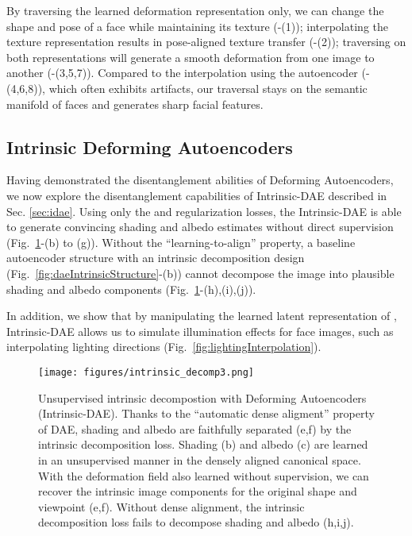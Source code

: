 \documentclass[runningheads]{llncs}
\begin{document}
By traversing the learned deformation representation only, we can change the shape and pose of a face while maintaining its texture (-(1)); interpolating the texture representation results in pose-aligned texture transfer (-(2)); traversing on both representations will generate a smooth deformation from one image to another (-(3,5,7)). Compared to the interpolation using the autoencoder (-(4,6,8)), which often exhibits artifacts, our traversal stays on the semantic manifold of faces and generates sharp facial features.

\subsection{Intrinsic Deforming Autoencoders}
Having demonstrated the disentanglement abilities of Deforming Autoencoders, we now  explore the disentanglement capabilities of Intrinsic-DAE described in Sec. \ref{sec:idae}. 
Using only the  and regularization losses, the Intrinsic-DAE is able to generate convincing shading and albedo estimates without direct supervision (Fig.~\ref{fig:intrinsicDecomp}-(b) to (g)).
Without the ``learning-to-align'' property, a baseline autoencoder structure with an intrinsic decomposition design (Fig.~\ref{fig:daeIntrinsicStructure}-(b)) cannot decompose the image into plausible shading and albedo components (Fig.~\ref{fig:intrinsicDecomp}-(h),(i),(j)).

In addition, we show that by manipulating the learned latent representation of , Intrinsic-DAE allows us to simulate illumination effects for face images, such as interpolating lighting directions (Fig.~\ref{fig:lightingInterpolation}).

\begin{figure}[ht!]
    \centering
    \texttt{[image: figures/intrinsic\_decomp3.png]}
    \caption{Unsupervised intrinsic decompostion with Deforming Autoencoders (Intrinsic-DAE). Thanks to the ``automatic dense aligment'' property of DAE, shading and albedo are faithfully separated (e,f) by the intrinsic decomposition loss. Shading (b) and albedo (c) are learned in an unsupervised manner in the densely aligned canonical space. With the  deformation field also learned  without supervision, we can recover the intrinsic image components for the original shape and viewpoint (e,f). Without dense alignment, the intrinsic decomposition loss fails to decompose shading and albedo (h,i,j).}
    \label{fig:intrinsicDecomp}
\end{figure}
\end{document}
